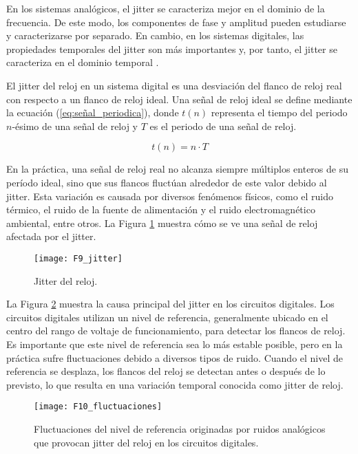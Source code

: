             En los sistemas analógicos, el jitter se caracteriza mejor en el dominio de la frecuencia. De este modo, los componentes de fase y amplitud pueden estudiarse y caracterizarse por separado. En cambio, en los sistemas digitales, las propiedades temporales del jitter son más importantes y, por tanto, el jitter se caracteriza en el dominio temporal \cite{Fischer2003}.

            El jitter del reloj en un sistema digital es una desviación del flanco de reloj real con respecto a un flanco de reloj ideal. Una señal de reloj ideal se define mediante la ecuación (\ref{eq:señal_periodica}), donde $t(n)$ representa el tiempo del periodo $n$-ésimo de una señal de reloj y $T$ es el periodo de una señal de reloj.

            \begin{equation}
                t(n) = n \cdot T 
                \label{eq:señal_periodica}
            \end{equation}

            En la práctica, una señal de reloj real no alcanza siempre múltiplos enteros de su período ideal, sino que sus flancos fluctúan alrededor de este valor debido al jitter. Esta variación es causada por diversos fenómenos físicos, como el ruido térmico, el ruido de la fuente de alimentación y el ruido electromagnético ambiental, entre otros. La Figura \ref{fig:F9_jitter} muestra cómo se ve una señal de reloj afectada por el jitter.

            \begin{figure}[hbtp]
                \caption{Jitter del reloj.}
                \centering
                \texttt{[image: F9\_jitter]}
                \label{fig:F9_jitter}
            \end{figure}
                
            La Figura \ref{fig:F10_fluctuaciones} muestra la causa principal del jitter en los circuitos digitales. Los circuitos digitales utilizan un nivel de referencia, generalmente ubicado en el centro del rango de voltaje de funcionamiento, para detectar los flancos de reloj. Es importante que este nivel de referencia sea lo más estable posible, pero en la práctica sufre fluctuaciones debido a diversos tipos de ruido. Cuando el nivel de referencia se desplaza, los flancos del reloj se detectan antes o después de lo previsto, lo que resulta en una variación temporal conocida como jitter de reloj.

            \begin{figure}[hbtp]
                \caption{Fluctuaciones del nivel de referencia originadas por ruidos analógicos que provocan jitter del reloj en los circuitos digitales. \cite{Petura2019}}
                \centering
                \texttt{[image: F10\_fluctuaciones]}
                \label{fig:F10_fluctuaciones}
            \end{figure}
        
